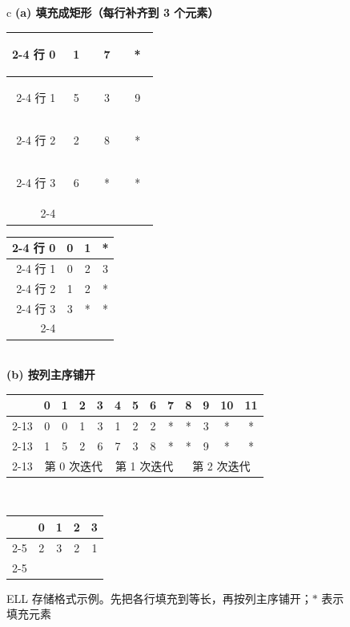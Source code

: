 \begin{figure}[htbp]
  \centering
  \small
  \begin{tabular}{c}
  \textbf{(a) 填充成矩形（每行补齐到 3 个元素）}\\[0.5em]
  \setlength{\tabcolsep}{4pt}
  \begin{tabular}{r|c|c|c|}
    \cline{2-4}
    行 0 & \colorbox{red!18}{\strut\ 1\ } & \colorbox{red!18}{\strut\ 7\ } & \strut\ *\ \\
    \cline{2-4}
    行 1 & \colorbox{green!22}{\strut\ 5\ } & \colorbox{green!22}{\strut\ 3\ } & \colorbox{green!22}{\strut\ 9\ }\\
    \cline{2-4}
    行 2 & \colorbox{yellow!35}{\strut\ 2\ } & \colorbox{yellow!35}{\strut\ 8\ } & \strut\ *\ \\
    \cline{2-4}
    行 3 & \colorbox{blue!18}{\strut\ 6\ } & \strut\ *\ & \strut\ *\ \\
    \cline{2-4}
  \end{tabular}
  \qquad
  \begin{tabular}{r|c|c|c|}
    \cline{2-4}
    行 0 & 0 & 1 & * \\
    \cline{2-4}
    行 1 & 0 & 2 & 3 \\
    \cline{2-4}
    行 2 & 1 & 2 & * \\
    \cline{2-4}
    行 3 & 3 & * & * \\
    \cline{2-4}
  \end{tabular}
  \\[1.2em]
  \textbf{(b) 按列主序铺开}\\[0.5em]
  \setlength{\tabcolsep}{4pt}
  \begin{tabular}{r|c|c|c|c|c|c|c|c|c|c|c|c|}
    \multicolumn{1}{c}{} & \multicolumn{1}{c}{0} & \multicolumn{1}{c}{1}
      & \multicolumn{1}{c}{2} & \multicolumn{1}{c}{3} & \multicolumn{1}{c}{4}
      & \multicolumn{1}{c}{5} & \multicolumn{1}{c}{6} & \multicolumn{1}{c}{7}
      & \multicolumn{1}{c}{8} & \multicolumn{1}{c}{9} & \multicolumn{1}{c}{10}
      & \multicolumn{1}{c}{11}\\
    \cline{2-13}
    \code{colIdx} & 0 & 0 & 1 & 3 & 1 & 2 & 2 & * & * & 3 & * & *\\
    \cline{2-13}
    \code{value}  & 1 & 5 & 2 & 6 & 7 & 3 & 8 & * & * & 9 & * & *\\
    \cline{2-13}
    \multicolumn{1}{c}{} & \multicolumn{4}{c}{\footnotesize 第 0 次迭代}
      & \multicolumn{4}{c}{\footnotesize 第 1 次迭代} & \multicolumn{4}{c}{\footnotesize 第 2 次迭代}
  \end{tabular}
  \\[0.6em]
  \setlength{\tabcolsep}{4pt}
  \begin{tabular}{r|c|c|c|c|}
    \multicolumn{1}{c}{} & \multicolumn{1}{c}{0} & \multicolumn{1}{c}{1}
      & \multicolumn{1}{c}{2} & \multicolumn{1}{c}{3}\\
    \cline{2-5}
    \code{nnzPerRow} & 2 & 3 & 2 & 1\\
    \cline{2-5}
  \end{tabular}
  \end{tabular}
  \caption{ELL 存储格式示例。先把各行填充到等长，再按列主序铺开；$*$ 表示填充元素}
  \label{fig:17-10}
\end{figure}

